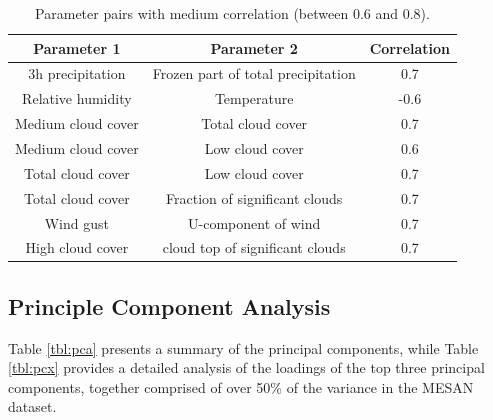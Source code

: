 \begin{table}[H]
	\centering
	\begin{tabular}{|c|c|c|}
		\hline
		\textbf{Parameter 1} & \textbf{Parameter 2} & \textbf{Correlation} \\
		\hline \hline
		3h precipitation & Frozen part of total precipitation & 0.7 \\
		\hline
		Relative humidity & Temperature & -0.6 \\
		\hline
		Medium cloud cover & Total cloud cover & 0.7 \\
		\hline
		Medium cloud cover & Low cloud cover & 0.6 \\
		\hline
		Total cloud cover & Low cloud cover & 0.7 \\
		\hline
		Total cloud cover & Fraction of significant clouds & 0.7 \\
		\hline
		Wind gust & U-component of wind & 0.7 \\
		\hline
		High cloud cover & cloud top of significant clouds & 0.7 \\
		\hline
	\end{tabular}
	\caption{Parameter pairs with medium correlation (between 0.6 and 0.8).}
	\label{tbl:correlation-medium}
\end{table}

\newpage
\subsection{Principle Component Analysis}
\label{sec:analysis-mesan-pca}

Table \ref{tbl:pca} presents a summary of the principal components, while Table \ref{tbl:pcx} provides a detailed analysis of the loadings of the top three principal components, together comprised of over 50\% of the variance in the MESAN dataset. 

